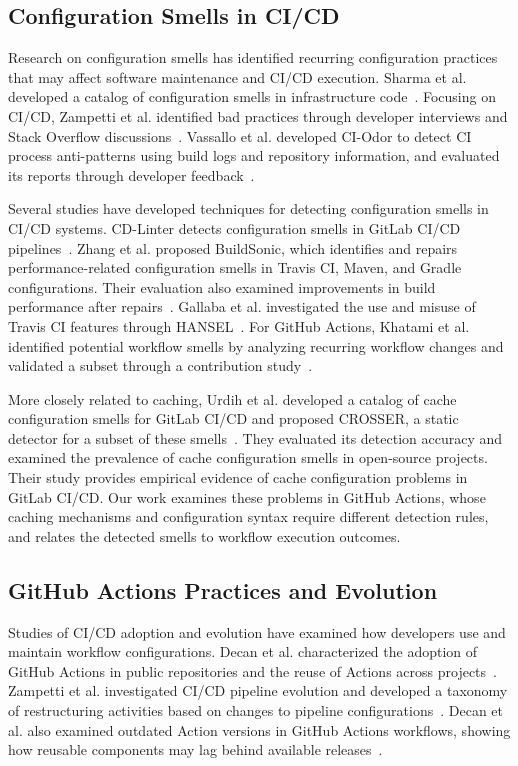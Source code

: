 \documentclass[smallextended]{svjour3}
\begin{document}
\subsection{Configuration Smells in CI/CD}

Research on configuration smells has identified recurring configuration practices that may affect software maintenance and CI/CD execution. Sharma et al. developed a catalog of configuration smells in infrastructure code~\citep{sharma2016configuration}. Focusing on CI/CD, Zampetti et al. identified bad practices through developer interviews and Stack Overflow discussions~\citep{zampetti2020badpractices}. Vassallo et al. developed CI-Odor to detect CI process anti-patterns using build logs and repository information, and evaluated its reports through developer feedback~\citep{vassallo2019ciodor}.

Several studies have developed techniques for detecting configuration smells in CI/CD systems. CD-Linter detects configuration smells in GitLab CI/CD pipelines~\citep{vassallo2020cd}. Zhang et al. proposed BuildSonic, which identifies and repairs performance-related configuration smells in Travis CI, Maven, and Gradle configurations. Their evaluation also examined improvements in build performance after repairs~\citep{zhang2022buildsonic}. Gallaba et al. investigated the use and misuse of Travis CI features through HANSEL~\citep{gallaba2020travis}. For GitHub Actions, Khatami et al. identified potential workflow smells by analyzing recurring workflow changes and validated a subset through a contribution study~\citep{khatami2024gha}.

More closely related to caching, Urdih et al. developed a catalog of cache configuration smells for GitLab CI/CD and proposed CROSSER, a static detector for a subset of these smells~\citep{urdih2026cache}. They evaluated its detection accuracy and examined the prevalence of cache configuration smells in open-source projects. Their study provides empirical evidence of cache configuration problems in GitLab CI/CD. Our work examines these problems in GitHub Actions, whose caching mechanisms and configuration syntax require different detection rules, and relates the detected smells to workflow execution outcomes.

\subsection{GitHub Actions Practices and Evolution}

Studies of CI/CD adoption and evolution have examined how developers use and maintain workflow configurations. Decan et al. characterized the adoption of GitHub Actions in public repositories and the reuse of Actions across projects~\citep{decan2022use}. Zampetti et al. investigated CI/CD pipeline evolution and developed a taxonomy of restructuring activities based on changes to pipeline configurations~\citep{zampetti2021ci}. Decan et al. also examined outdated Action versions in GitHub Actions workflows, showing how reusable components may lag behind available releases~\citep{decan2023outdatedness}.
\end{document}
